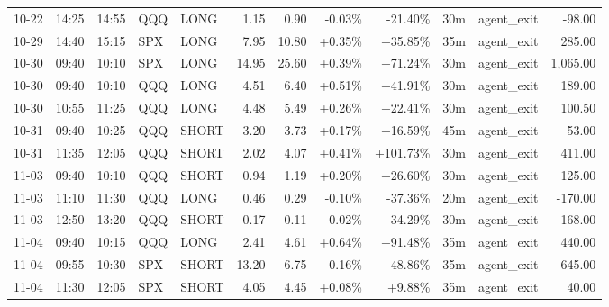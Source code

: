 \documentclass[11pt,a4paper,twoside]{article}
\begin{document}
\begin{center}
\begin{longtable}{>{\color{txtmain}}l l l l l r r r r r >{\color{txtmain}}l r}
10-22 & 14:25 & 14:55 & QQQ & LONG & 1.15 & 0.90 & \textcolor{lossred}{-0.03\%} & \textcolor{lossred}{-21.40\%} & 30m & agent\_exit & \textcolor{lossred}{-98.00} \\
10-29 & 14:40 & 15:15 & SPX & LONG & 7.95 & 10.80 & \textcolor{wingreen}{+0.35\%} & \textcolor{wingreen}{+35.85\%} & 35m & agent\_exit & \textcolor{wingreen}{285.00} \\
10-30 & 09:40 & 10:10 & SPX & LONG & 14.95 & 25.60 & \textcolor{wingreen}{+0.39\%} & \textcolor{wingreen}{+71.24\%} & 30m & agent\_exit & \textcolor{wingreen}{1,065.00} \\
10-30 & 09:40 & 10:10 & QQQ & LONG & 4.51 & 6.40 & \textcolor{wingreen}{+0.51\%} & \textcolor{wingreen}{+41.91\%} & 30m & agent\_exit & \textcolor{wingreen}{189.00} \\
10-30 & 10:55 & 11:25 & QQQ & LONG & 4.48 & 5.49 & \textcolor{wingreen}{+0.26\%} & \textcolor{wingreen}{+22.41\%} & 30m & agent\_exit & \textcolor{wingreen}{100.50} \\
10-31 & 09:40 & 10:25 & QQQ & SHORT & 3.20 & 3.73 & \textcolor{wingreen}{+0.17\%} & \textcolor{wingreen}{+16.59\%} & 45m & agent\_exit & \textcolor{wingreen}{53.00} \\
10-31 & 11:35 & 12:05 & QQQ & SHORT & 2.02 & 4.07 & \textcolor{wingreen}{+0.41\%} & \textcolor{wingreen}{+101.73\%} & 30m & agent\_exit & \textcolor{wingreen}{411.00} \\
11-03 & 09:40 & 10:10 & QQQ & SHORT & 0.94 & 1.19 & \textcolor{wingreen}{+0.20\%} & \textcolor{wingreen}{+26.60\%} & 30m & agent\_exit & \textcolor{wingreen}{125.00} \\
11-03 & 11:10 & 11:30 & QQQ & LONG & 0.46 & 0.29 & \textcolor{lossred}{-0.10\%} & \textcolor{lossred}{-37.36\%} & 20m & agent\_exit & \textcolor{lossred}{-170.00} \\
11-03 & 12:50 & 13:20 & QQQ & SHORT & 0.17 & 0.11 & \textcolor{lossred}{-0.02\%} & \textcolor{lossred}{-34.29\%} & 30m & agent\_exit & \textcolor{lossred}{-168.00} \\
11-04 & 09:40 & 10:15 & QQQ & LONG & 2.41 & 4.61 & \textcolor{wingreen}{+0.64\%} & \textcolor{wingreen}{+91.48\%} & 35m & agent\_exit & \textcolor{wingreen}{440.00} \\
11-04 & 09:55 & 10:30 & SPX & SHORT & 13.20 & 6.75 & \textcolor{lossred}{-0.16\%} & \textcolor{lossred}{-48.86\%} & 35m & agent\_exit & \textcolor{lossred}{-645.00} \\
11-04 & 11:30 & 12:05 & SPX & SHORT & 4.05 & 4.45 & \textcolor{wingreen}{+0.08\%} & \textcolor{wingreen}{+9.88\%} & 35m & agent\_exit & \textcolor{wingreen}{40.00} \\

\end{longtable}
\end{center}
\end{document}
